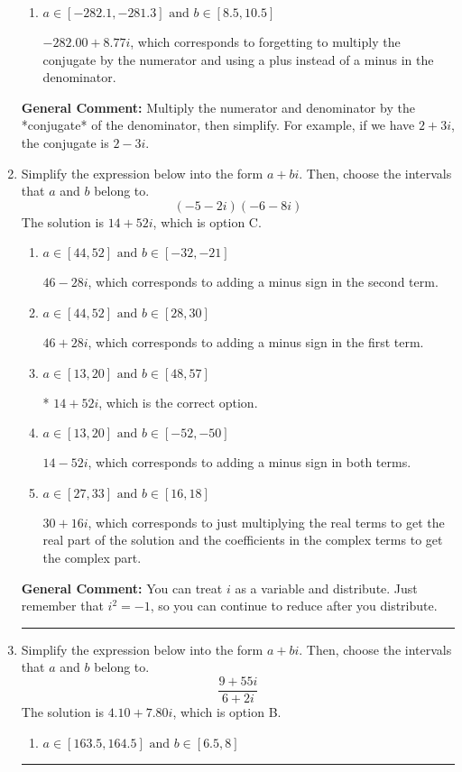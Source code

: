 \documentclass{extbook}[14pt]
\newcommand{\litem}[1]{\item #1

\rule{\textwidth}{0.4pt}}
\begin{document}
\begin{enumerate}
{\begin{enumerate}[label=\Alph*.]
 $-10.85  + 228.00 i$, which corresponds to forgetting to multiply the conjugate by the numerator.
\item \( a \in [-282.1, -281.3] \text{ and } b \in [8.5, 10.5] \)

 $-282.00  + 8.77 i$, which corresponds to forgetting to multiply the conjugate by the numerator and using a plus instead of a minus in the denominator.
\end{enumerate}

\textbf{General Comment:} Multiply the numerator and denominator by the *conjugate* of the denominator, then simplify. For example, if we have $2+3i$, the conjugate is $2-3i$.
}
\litem{
Simplify the expression below into the form $a+bi$. Then, choose the intervals that $a$ and $b$ belong to.
\[ (-5 - 2 i)(-6 - 8 i) \]The solution is \( 14 + 52 i \), which is option C.\begin{enumerate}[label=\Alph*.]
\item \( a \in [44, 52] \text{ and } b \in [-32, -21] \)

 $46 - 28 i$, which corresponds to adding a minus sign in the second term.
\item \( a \in [44, 52] \text{ and } b \in [28, 30] \)

 $46 + 28 i$, which corresponds to adding a minus sign in the first term.
\item \( a \in [13, 20] \text{ and } b \in [48, 57] \)

* $14 + 52 i$, which is the correct option.
\item \( a \in [13, 20] \text{ and } b \in [-52, -50] \)

 $14 - 52 i$, which corresponds to adding a minus sign in both terms.
\item \( a \in [27, 33] \text{ and } b \in [16, 18] \)

 $30 + 16 i$, which corresponds to just multiplying the real terms to get the real part of the solution and the coefficients in the complex terms to get the complex part.
\end{enumerate}

\textbf{General Comment:} You can treat $i$ as a variable and distribute. Just remember that $i^2=-1$, so you can continue to reduce after you distribute.
}
\litem{
Simplify the expression below into the form $a+bi$. Then, choose the intervals that $a$ and $b$ belong to.
\[ \frac{9 + 55 i}{6 + 2 i} \]The solution is \( 4.10  + 7.80 i \), which is option B.\begin{enumerate}[label=\Alph*.]
\item \( a \in [163.5, 164.5] \text{ and } b \in [6.5, 8] \)


\end{enumerate}}
\end{enumerate}
\end{document}
